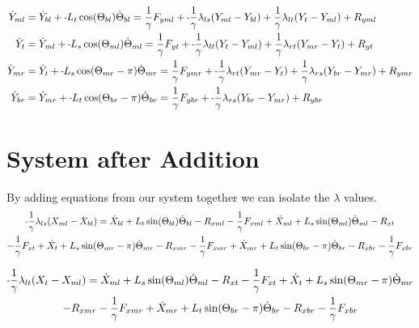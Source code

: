 \documentclass[11pt, landscape]{article}
\newcommand{\mn}{\scalebox{0.7}[1.0]{-}}
\begin{document}
\begin{align}  
  \dot{Y}_{ml} &= \dot{Y}_{bl} + \mn L_{t}\cos(\Theta_{bl})      \dot{\Theta}_{bl} = \frac{1}{\gamma}F_{yml} + \mn\frac{1}{\gamma}\lambda_{ls}(Y_{ml} - Y_{bl}) + \frac{1}{\gamma}\lambda_{lt}(Y_{t } - Y_{ml}) + R_{yml} \\
  \dot{Y}_{t}  &= \dot{Y}_{ml} + \mn L_{s}\cos(\Theta_{ml})      \dot{\Theta}_{ml} = \frac{1}{\gamma}F_{yt } + \mn\frac{1}{\gamma}\lambda_{lt}(Y_{t } - Y_{ml}) + \frac{1}{\gamma}\lambda_{rt}(Y_{mr} - Y_{t }) + R_{yt } \\
  \dot{Y}_{mr} &= \dot{Y}_{t } + \mn L_{s}\cos(\Theta_{mr}-\pi)  \dot{\Theta}_{mr} = \frac{1}{\gamma}F_{ymr} + \mn\frac{1}{\gamma}\lambda_{rt}(Y_{mr} - Y_{t }) + \frac{1}{\gamma}\lambda_{rs}(Y_{br} - Y_{mr}) + R_{ymr} \\
  \dot{Y}_{br} &= \dot{Y}_{mr} + \mn L_{t}\cos(\Theta_{br}-\pi)  \dot{\Theta}_{br} = \frac{1}{\gamma}F_{ybr} + \mn\frac{1}{\gamma}\lambda_{rs}(Y_{br} - Y_{mr}) + R_{ybr}
\end{align}



\section{System after Addition}
By adding equations from our system together we can isolate the $\lambda$ values. \\

\begin{multline}
\mn\frac{1}{\gamma}\lambda_{ls}(X_{ml} - X_{bl}) =
\dot{X}_{bl} + L_{t}\sin(\Theta_{bl})      \dot{\Theta}_{bl} - R_{xml} - \frac{1}{\gamma}F_{xml} + \dot{X}_{ml} + L_{s}\sin(\Theta_{ml}) \dot{\Theta}_{ml} - R_{xt } \\
- \frac{1}{\gamma}F_{xt } + \dot{X}_{t } + L_{s}\sin(\Theta_{mr}-\pi)  \dot{\Theta}_{mr} - R_{xmr}
-\frac{1}{\gamma}F_{xmr} + \dot{X}_{mr} + L_{t}\sin(\Theta_{br}-\pi)  \dot{\Theta}_{br} - R_{xbr} - \frac{1}{\gamma}F_{xbr}
\end{multline}

\begin{multline}
\mn\frac{1}{\gamma}\lambda_{lt}(X_{t } - X_{ml}) =
\dot{X}_{ml} + L_{s}\sin(\Theta_{ml})      \dot{\Theta}_{ml} - R_{xt } - \frac{1}{\gamma}F_{xt } + \dot{X}_{t } + L_{s}\sin(\Theta_{mr}-\pi)  \dot{\Theta}_{mr} \\
- R_{xmr} - \frac{1}{\gamma}F_{xmr} + \dot{X}_{mr} + L_{t}\sin(\Theta_{br}-\pi)  \dot{\Theta}_{br} - R_{xbr} - \frac{1}{\gamma}F_{xbr}
\end{multline}
\end{document}
